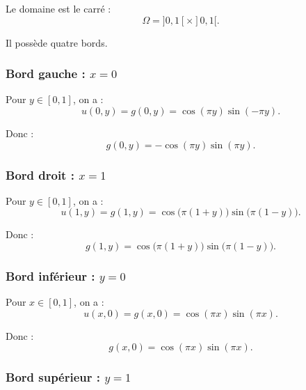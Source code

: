 \documentclass[12pt,a4paper]{article}
\begin{document}
	Le domaine est le carré :
	\begin{equation*}
	\Omega=]0,1[\times]0,1[.
	\end{equation*}
	
	Il possède quatre bords.
	
	\subsubsection*{Bord gauche : \(x=0\)}
	
	Pour \(y\in[0,1]\), on a :
	\begin{equation*}
	u(0,y)
	=
	g(0,y)
	=
	\cos(\pi y)\sin(-\pi y).
	\end{equation*}
	
	Donc :
	\begin{equation*}
	\boxed{
		g(0,y)
		=
		-\cos(\pi y)\sin(\pi y).
	}
	\end{equation*}
	
	\subsubsection*{Bord droit : \(x=1\)}
	
	Pour \(y\in[0,1]\), on a :
	\begin{equation*}
	u(1,y)
	=
	g(1,y)
	=
	\cos\bigl(\pi(1+y)\bigr)
	\sin\bigl(\pi(1-y)\bigr).
	\end{equation*}
	
	Donc :
	\begin{equation*}
	\boxed{
		g(1,y)
		=
		\cos\bigl(\pi(1+y)\bigr)
		\sin\bigl(\pi(1-y)\bigr).
	}
	\end{equation*}
	
	\subsubsection*{Bord inférieur : \(y=0\)}
	
	Pour \(x\in[0,1]\), on a :
	\begin{equation*}
	u(x,0)
	=
	g(x,0)
	=
	\cos(\pi x)\sin(\pi x).
	\end{equation*}
	
	Donc :
	\begin{equation*}
	\boxed{
		g(x,0)
		=
		\cos(\pi x)\sin(\pi x).
	}
	\end{equation*}
	
	\subsubsection*{Bord supérieur : \(y=1\)}
	
\end{document}
